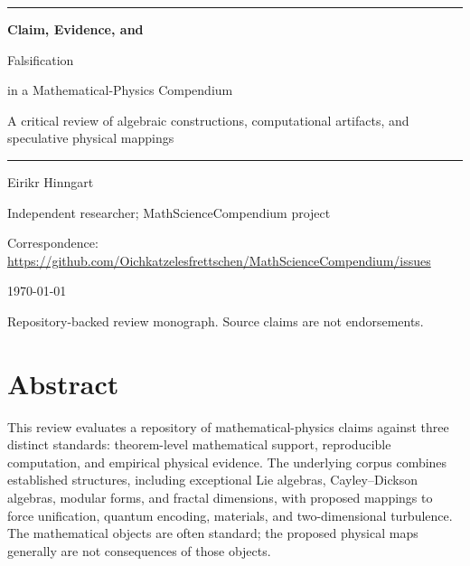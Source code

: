 \documentclass[11pt,oneside]{book}
\begin{document}

\begin{titlepage}
  \color{ink}
  \vspace*{0.12\textheight}
  {\color{navy}\rule{\textwidth}{1.2pt}}\par
  \vspace{1.4em}
  {\fontsize{31}{36}\selectfont\bfseries
   Claim, Evidence, and\par
   Falsification\par}
  \vspace{0.45em}
  {\fontsize{21}{25}\selectfont
   in a Mathematical-Physics Compendium\par}
  \vspace{1.4em}
  {\large A critical review of algebraic constructions,
   computational artifacts, and speculative physical mappings\par}
  \vspace{1.4em}
  {\color{rulegray}\rule{0.62\textwidth}{0.7pt}}\par
  \vfill
  {\large Eirikr Hinngart\par}
  \vspace{0.3em}
  {\small Independent researcher; MathScienceCompendium project\par}
  {\small Correspondence:
   \url{https://github.com/Oichkatzelesfrettschen/MathScienceCompendium/issues}\par}
  \vspace{0.5em}
  {\color{muted}\today\par}
  \vspace{1.2em}
  {\small\color{muted}
   Repository-backed review monograph. Source claims are not endorsements.\par}
\end{titlepage}

\frontmatter

\chapter*{Abstract}

This review evaluates a repository of mathematical-physics claims against
three distinct standards: theorem-level mathematical support, reproducible
computation, and empirical physical evidence. The underlying corpus combines
established structures, including exceptional Lie algebras, Cayley--Dickson
algebras, modular forms, and fractal dimensions, with proposed mappings to
force unification, quantum encoding, materials, and two-dimensional
turbulence. The mathematical objects are often standard; the proposed physical
maps generally are not consequences of those objects.
\end{document}
